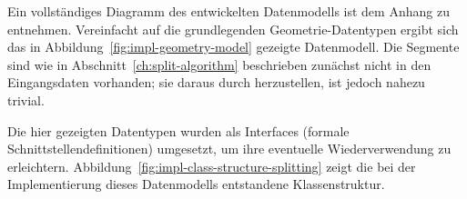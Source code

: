 \documentclass[../main/thesis.tex]{subfiles}
\begin{document}
Ein vollständiges Diagramm des entwickelten Datenmodells ist dem Anhang zu entnehmen.
Vereinfacht auf die grundlegenden Geometrie-Datentypen ergibt sich das in Abbildung~\ref{fig:impl-geometry-model} gezeigte Datenmodell.
Die Segmente sind wie in Abschnitt~\ref{ch:split-algorithm} beschrieben zunächst nicht in den Eingangsdaten vorhanden; sie daraus durch  herzustellen, ist jedoch nahezu trivial.



Die hier gezeigten Datentypen wurden als Interfaces (formale Schnittstellendefinitionen) umgesetzt, um ihre eventuelle Wiederverwendung zu erleichtern. 
Abbildung~\ref{fig:impl-class-structure-splitting} zeigt die bei der Implementierung dieses Datenmodells entstandene Klassenstruktur.

\end{document}
